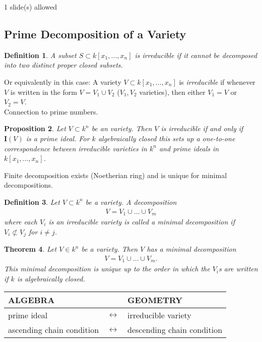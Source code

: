 \documentclass[11pt,a4paper,english]{scrartcl}
\newtheorem{defn}{Definition}
\newtheorem{thm}[defn]{Theorem}
\newtheorem{prop}[defn]{Proposition}
\newcommand{\I}{\mathbf{I}}
\newcommand{\mvar}[2]{#1_1,\ldots , #1_{#2}}
\newcommand{\kxn}{k[\mvar{x}{n}]}
\newcommand{\needSlides}[1]{\newpage \begin{needSl}#1 slide(s) allowed\end{needSl}}
\begin{document}
\needSlides{1}
\subsection{Prime Decomposition of a Variety}
\begin{defn}
A subset $S\subset \kxn$ is \emph{irreducible} if it cannot be decomposed into two distinct proper closed subsets.
\end{defn}
Or equivalently in this case: A variety $V \subset \kxn$ is \emph{irreducible} if whenever $V$ is written in the form $V = V_1 \cup V_2$ ($V_1,V_2$ varieties), then either $V_1 = V$ or $V_2 = V$.\\
Connection to prime numbers.
\begin{prop}
Let $V\subset k^n$ be an variety. Then $V$ is irreducible if and only if $\I (V)$ is a prime ideal. For $k$ algebraically closed this sets up a one-to-one correspondence between irreducible varieties in $k^n$ and prime ideals in $\kxn$.
\end{prop}

Finite decomposition exists (Noetherian ring) and is unique for minimal decompositions.

\begin{defn}
Let $V \subset k^n$ be a variety. A decomposition 
\begin{align*}
V = V_1 \cup \ldots \cup V_m
\end{align*}
where each $V_i$ is an irreducible variety is called a \emph{minimal decomposition} if $V_i\not\subset V_j$ for $i\neq j$.
\end{defn}
\begin{thm}
\label{thmdecvar}
Let $V\in k^n$ be a variety. Then $V$ has a minimal decomposition
\begin{align*}
V = V_1 \cup \ldots \cup V_m.
\end{align*}
This minimal decomposition is unique up to the order in which the $V_i$s are written if $k$ is algebraically closed.
\end{thm}

\begin{center}
\begin{tabular}{>{\Centering}p{} >{\Centering}p{} >{\Centering}p{} }
\toprule
\textbf{ALGEBRA} & & \textbf{GEOMETRY}\\
\midrule
prime ideal &$\leftrightarrow$ & irreducible variety\\
\midrule
ascending chain condition &$\leftrightarrow$ & descending chain condition\\
\bottomrule
\end{tabular}
\end{center}
\end{document}
